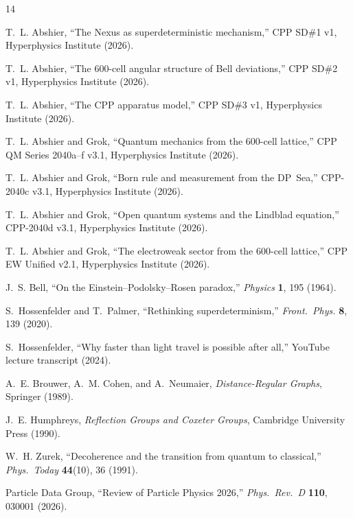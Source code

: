 \documentclass[11pt,a4paper]{article}
\begin{document}

\begin{thebibliography}{14}

T.~L. Abshier,
``The Nexus as superdeterministic mechanism,''
CPP SD\#1 v1, Hyperphysics Institute (2026).

T.~L. Abshier,
``The 600-cell angular structure of Bell deviations,''
CPP SD\#2 v1, Hyperphysics Institute (2026).

T.~L. Abshier,
``The CPP apparatus model,''
CPP SD\#3 v1, Hyperphysics Institute (2026).

T.~L. Abshier and Grok,
``Quantum mechanics from the 600-cell lattice,''
CPP QM Series 2040a--f v3.1, Hyperphysics Institute (2026).

T.~L. Abshier and Grok,
``Born rule and measurement from the DP~Sea,''
CPP-2040c v3.1, Hyperphysics Institute (2026).

T.~L. Abshier and Grok,
``Open quantum systems and the Lindblad equation,''
CPP-2040d v3.1, Hyperphysics Institute (2026).

T.~L. Abshier and Grok,
``The electroweak sector from the 600-cell lattice,''
CPP EW Unified v2.1, Hyperphysics Institute (2026).

J.~S. Bell,
``On the Einstein--Podolsky--Rosen paradox,''
\textit{Physics} \textbf{1}, 195 (1964).

S.~Hossenfelder and T.~Palmer,
``Rethinking superdeterminism,''
\textit{Front.\ Phys.} \textbf{8}, 139 (2020).

S.~Hossenfelder,
``Why faster than light travel is possible after all,''
YouTube lecture transcript (2024).

A.~E. Brouwer, A.~M. Cohen, and A.~Neumaier,
\textit{Distance-Regular Graphs}, Springer (1989).

J.~E. Humphreys,
\textit{Reflection Groups and Coxeter Groups},
Cambridge University Press (1990).

W.~H. Zurek,
``Decoherence and the transition from quantum to classical,''
\textit{Phys.\ Today} \textbf{44}(10), 36 (1991).

Particle Data Group,
``Review of Particle Physics 2026,''
\textit{Phys.\ Rev.\ D} \textbf{110}, 030001 (2026).

\end{thebibliography}
\end{document}

